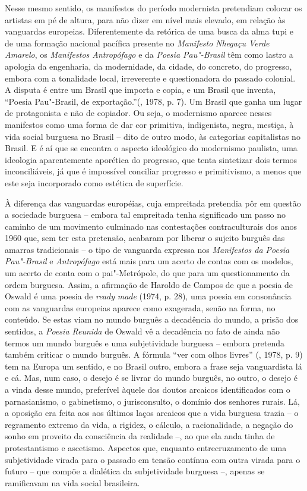 Nesse mesmo sentido, os manifestos do período modernista pretendiam
colocar os artistas em pé de altura, para não dizer em nível mais
elevado, em relação às vanguardas europeias. Diferentemente da retórica
de uma busca da alma tupi e de uma formação nacional pacífica presente
no \emph{Manifesto} \emph{Nhegaçu Verde Amarelo}, os \emph{Manifestos
Antropófago} e da \emph{Poesia Pau"-Brasil} têm como lastro a apologia da
engenharia, da modernidade, da cidade, do concreto, do progresso, embora
com a tonalidade local, irreverente e questionadora do passado colonial.
A disputa é entre um Brasil que importa e copia, e um Brasil que
inventa, ``Poesia Pau"-Brasil, de exportação.''(, 1978, p. 7). Um
Brasil que ganha um lugar de protagonista e não de copiador. Ou seja, o
modernismo aparece nesses manifestos como uma forma de dar cor
primitiva, indigenista, negra, mestiça, à vida social burguesa no Brasil
-- dito de outro modo, às categorias capitalistas no Brasil. E é aí que
se encontra o aspecto ideológico do modernismo paulista, uma ideologia
aparentemente aporética do progresso, que tenta sintetizar dois termos
inconciliáveis, já que é impossível conciliar progresso e primitivismo,
a menos que este seja incorporado como estética de superfície.

À diferença das vanguardas européias, cuja empreitada pretendia pôr em
questão a sociedade burguesa -- embora tal empreitada tenha significado
um passo no caminho de um movimento culminado nas contestações
contraculturais dos anos 1960 que, sem ter esta pretensão, acabaram por
liberar o sujeito burguês das amarras tradicionais -- o tipo de
vanguarda expressa nos \emph{Manifestos da Poesia Pau"-Brasil} e
\emph{Antropófago} está mais para um acerto de contas com os modelos, um
acerto de conta com o pai"-Metrópole, do que para um questionamento da
ordem burguesa. Assim, a afirmação de Haroldo de Campos de que a poesia
de Oswald é uma poesia de \emph{ready} \emph{made} (1974, p. 28), uma
poesia em consonância com as vanguardas europeias aparece como
exagerada, senão na forma, no conteúdo. Se estas viam no mundo burguês a
decadência do mundo, a prisão dos sentidos, a \emph{Poesia Reunida} de
Oswald vê a decadência no fato de ainda não termos um mundo burguês e
uma subjetividade burguesa -- embora pretenda também criticar o mundo
burguês. A fórmula ``ver com olhos livres'' (, 1978, p. 9)
tem na Europa um sentido, e no Brasil outro, embora a frase seja
vanguardista lá e cá. Mas, num caso, o desejo é se livrar do mundo
burguês, no outro, o desejo é a vinda desse mundo, preferível àquele dos
doutos arcaicos identificados com o parnasianismo, o gabinetismo, o
jurisconsulto, o domínio dos senhores rurais. Lá, a oposição era feita
aos aos últimos laços arcaicos que a vida burguesa trazia -- o
regramento extremo da vida, a rigidez, o cálculo, a racionalidade, a
negação do sonho em proveito da consciência da realidade --, ao que ela
anda tinha de protestantismo e ascetismo. Aspectos que, enquanto
entrecruzamento de uma subjetividade virada para o passado em tensão
contínua com outra virada para o futuro -- que compõe a dialética da
subjetividade burguesa --, apenas se ramificavam na vida social
brasileira.

